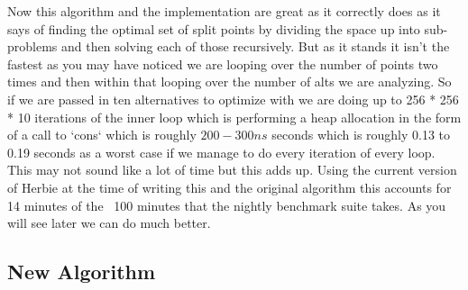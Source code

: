\documentclass{article}
\begin{document}
Now this algorithm and the implementation are great as it correctly does as it says of finding the optimal set of split points by dividing the space up into sub-problems and then solving each of those recursively. But as it stands it isn’t the fastest as you may have noticed we are looping over the number of points two times and then within that looping over the number of alts we are analyzing. So if we are passed in ten alternatives to optimize with we are doing up to 256 * 256 * 10 iterations of the inner loop which is performing a heap allocation in the form of a call to `cons` which is roughly $200-300 ns$ seconds which is roughly 0.13 to 0.19 seconds as a worst case if we manage to do every iteration of every loop. This may not sound like a lot of time but this adds up. Using the current version of Herbie at the time of writing this and the original algorithm this accounts for 14 minutes of the ~100 minutes that the nightly benchmark suite takes. As you will see later we can do much better.

\subsection{New Algorithm}
\end{document}
